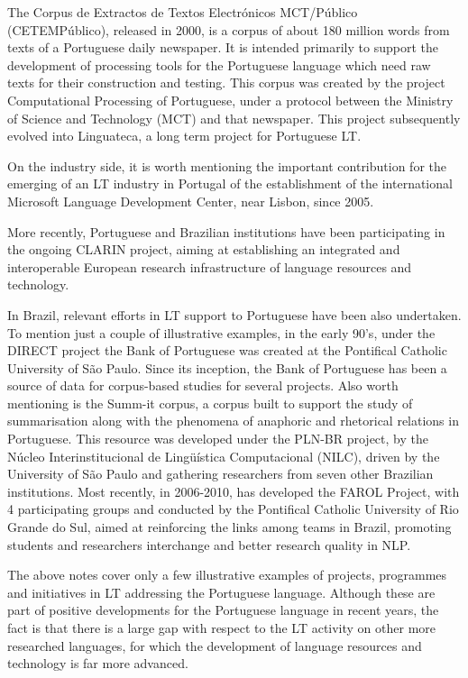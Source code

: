\begin{multicols}{2}
The Corpus de Extractos de Textos Electrónicos MCT/Público (CETEMPúblico), released in 2000, is a corpus of about 180 million words from texts of a Portuguese daily newspaper. It is intended primarily to support the development of processing tools for the Portuguese language which need raw texts for their construction and testing. This corpus was created by the project Computational Processing of Portuguese, under a protocol between the Ministry of Science and Technology (MCT) and that newspaper. This project subsequently evolved into Linguateca, a long term project for Portuguese LT\cite{linguateca}.

On the industry side, it is worth mentioning the important contribution for the emerging of an LT industry in Portugal of the establishment of the international Microsoft Language Development Center, near Lisbon, since 2005.

More recently, Portuguese and Brazilian institutions have been participating in the ongoing CLARIN project, aiming at establishing an integrated and interoperable European research infrastructure of language resources and technology.

In Brazil, relevant efforts in LT support to Portuguese have been also undertaken. To mention just a couple of illustrative examples, in the early 90's, under the DIRECT project the Bank of Portuguese was created at the Pontifical Catholic University of São Paulo. Since its inception, the Bank of Portuguese has been a source of data for corpus-based studies for several projects. Also worth mentioning is the Summ-it corpus, a corpus built to support the study of summarisation along with the phenomena of anaphoric and rhetorical relations in Portuguese. This resource was developed under the PLN-BR project, by the Núcleo Interinstitucional de Lingüística Computacional (NILC), driven by the University of São Paulo and gathering researchers from seven other Brazilian institutions. Most recently, in 2006-2010, has developed the FAROL Project, with 4 participating groups and conducted by the Pontifical Catholic University of Rio Grande do Sul, aimed at reinforcing the links among teams in Brazil, promoting students and researchers interchange and better research quality in NLP.

The above notes cover only a few illustrative examples of projects, programmes and initiatives in LT addressing the Portuguese language. Although these are part of positive developments for the Portuguese language in recent years, the fact is that there is a large gap with respect to the LT activity on other more researched languages, for which the development of language resources and technology is far more advanced. 


\end{multicols}
